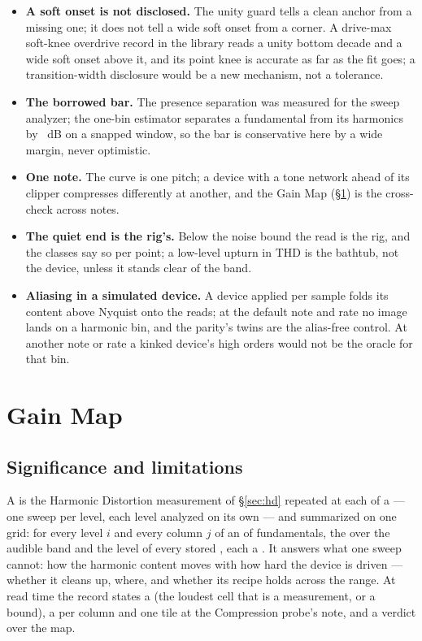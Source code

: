 \documentclass[11pt,a4paper]{article}
\begin{document}
{\begin{itemize}
  shipped code called.
  \item \textbf{A soft onset is not disclosed.} The unity guard tells a
  clean anchor from a missing one; it does not tell a wide soft onset from
  a corner. A drive-max soft-knee overdrive record in the library reads a
  unity bottom decade and a wide soft onset above it, and its point knee
  is accurate as far as the fit goes; a transition-width disclosure would be
  a new mechanism, not a tolerance.
  \item \textbf{The borrowed bar.} The presence separation was measured
  for the sweep analyzer; the one-bin estimator separates a fundamental
  from its harmonics by \cparitySeparation\ dB on a snapped window, so
  the bar is conservative here by a wide margin, never optimistic.
  \item \textbf{One note.} The curve is one pitch; a device with a tone
  network ahead of its clipper compresses differently at another, and the
  Gain Map (\S\ref{sec:journey}) is the cross-check across notes.
  \item \textbf{The quiet end is the rig's.} Below the noise bound the
  read is the rig, and the classes say so per point; a low-level upturn in
  THD is the bathtub, not the device, unless it stands clear of the band.
  \item \textbf{Aliasing in a simulated device.} A device applied per
  sample folds its content above Nyquist onto the reads; at the default
  note and rate no image lands on a harmonic bin, and the parity's twins
  are the alias-free control. At another note or rate a kinked device's
  high orders would not be the oracle for that bin.
\end{itemize}
\par}

\clearpage
\section{Gain Map}
\label{sec:journey}


\subsection{Significance and limitations}
A  is the Harmonic Distortion measurement of
\S\ref{sec:hd} repeated at each  of a 
--- one sweep per level, each level analyzed on its own --- and summarized
on one grid: for every level $i$ and every column $j$ of an
 of fundamentals, the  over the audible band and
the level of every stored , each a . It
answers what one sweep cannot: how the harmonic content moves with how hard
the device is driven --- whether it cleans up, where, and whether its
recipe holds across the range. At read time the record states a
 (the loudest cell that is a measurement, or a bound), a
 per column and one tile at the Compression probe's
note, and a  verdict over the map.
\end{document}
